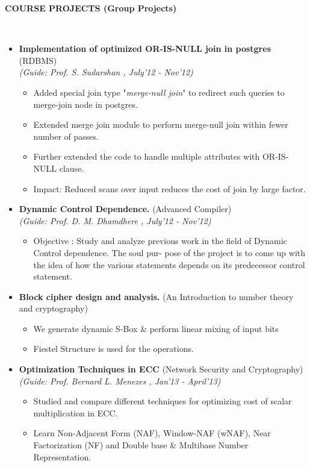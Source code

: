 \documentclass[letterpaper,10pt]{article}
\newcommand{\isep}{-2 pt}
\newcommand{\lsep}{-0.5cm}
\newcommand{\resheading}[1]{{\small \colorbox{mygrey}{\begin{minipage}{0.975\textwidth}{\textbf{#1 \vphantom{p\^{E}}}}\end{minipage}}}}
\begin{document}
\resheading{\textbf{COURSE PROJECTS} (Group Projects)}\\[\lsep]

\begin{itemize}
\item \textbf{Implementation of optimized OR-IS-NULL join in postgres} (RDBMS)\\
 \emph{(Guide: Prof. S. Sudarshan
, July'12 - Nov'12)} \\[-0.6cm]
	\begin{itemize}\itemsep \isep
	\item Added special join type "\emph{merge-null join}" to redirect such queries to merge-join node in postgres.
	\item Extended merge join module to perform merge-null join within fewer number of passes.
	\item Further extended the code to handle multiple attributes with OR-IS-NULL clause.
	\item Impact: Reduced scans over input reduces the cost of join by large factor.
	\end{itemize}

\item \textbf{Dynamic Control Dependence.} (Advanced Compiler)\\
 \emph{(Guide: Prof. D. M. Dhamdhere
, July'12 - Nov'12)} \\[-0.6cm]
	\begin{itemize}\itemsep \isep
	\item Objective : Study and analyze previous work in the field of Dynamic Control dependence. The soul pur-
pose of the project is to come up with the idea of how the various statements depends on its predecessor
control statement.
	\end{itemize}

\item \textbf{Block cipher design and analysis.} (An Introduction to number theory and cryptography)
	\begin{itemize}\itemsep \isep
	\item We generate dynamic S-Box \& perform linear mixing of input bits

	\item Fiestel Structure is used for the operations.
	\end{itemize}

\item \textbf{Optimization Techniques in ECC} (Network Security and Cryptography)\\
 \emph{(Guide: Prof. Bernard L. Menezes
, Jan'13 - April'13)} \\[-0.6cm]
	\begin{itemize}\itemsep \isep
	\item Studied and compare different techniques for optimizing cost of scalar multiplication in ECC.
	\item Learn Non-Adjacent Form (NAF), Window-NAF (wNAF), Near Factorization (NF) and Double base \&
Multibase Number Representation.
	\end{itemize}

\end{itemize}
\end{document}
